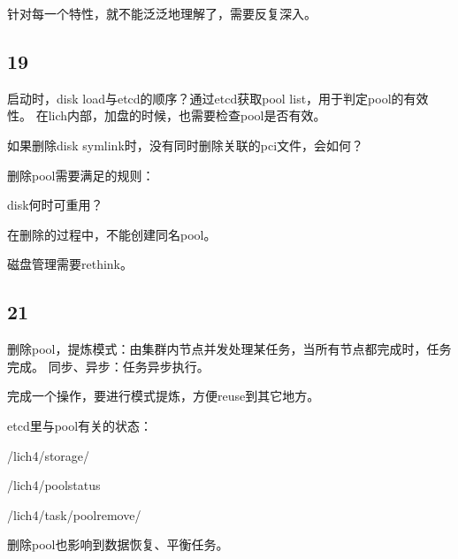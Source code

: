 针对每一个特性，就不能泛泛地理解了，需要反复深入。

\subsection{19}

启动时，disk load与etcd的顺序？通过etcd获取pool list，用于判定pool的有效性。
在lich内部，加盘的时候，也需要检查pool是否有效。

如果删除disk symlink时，没有同时删除关联的pci文件，会如何？

删除pool需要满足的规则：
\begin{enumbox}
\item disk何时可重用？
\item 在删除的过程中，不能创建同名pool。
\end{enumbox}

磁盘管理需要rethink。

\subsection{21}

删除pool，提炼模式：由集群内节点并发处理某任务，当所有节点都完成时，任务完成。
同步、异步：任务异步执行。

完成一个操作，要进行模式提炼，方便reuse到其它地方。

etcd里与pool有关的状态：
\begin{enumbox}
\item /lich4/storage/
\item /lich4/poolstatus
\item /lich4/task/poolremove/
\end{enumbox}

删除pool也影响到数据恢复、平衡任务。
